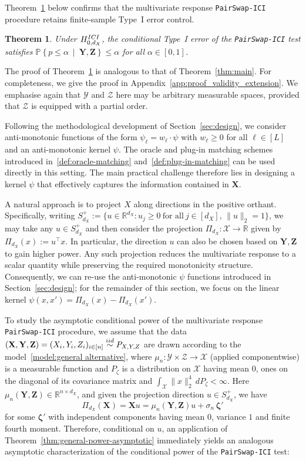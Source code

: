 \documentclass[12pt]{article}
\newtheorem{theorem}{Theorem}%
\newcommand{\R}{\mathbb{R}}
\newcommand{\eps}{\varepsilon}
\newcommand{\PPst}[2]{\mathbb{P}\left\{{#1}\  \middle| \ {#2}\right\}}
\newcommand{\iidsim}{\stackrel{\textnormal{iid}}{\sim}}
\newcommand{\Xcal}{\mathcal{X}}
\newcommand{\bX}{\mathbf{X}}
\newcommand{\bY}{\mathbf{Y}}
\newcommand{\bZ}{\mathbf{Z}}
\newcommand{\bzeta}{\mathbf{\eps}}
\def\bzeta{{\boldsymbol{\zeta}}}
\begin{document}
Theorem~\ref{thm:main-general} below confirms that the multivariate response \texttt{PairSwap-ICI} procedure retains finite-sample Type~I error control.

\begin{theorem}
    \label{thm:main-general}
    Under $H_{0,d_X}^{\textnormal{ICI}}$, the conditional Type~I error of the \textnormal{\texttt{PairSwap-ICI}} test satisfies $\PPst{p\le \alpha }{ \bY, \bZ}\le \alpha$ for all $\alpha \in [0,1]$.  
\end{theorem}


The proof of Theorem~\ref{thm:main-general} is analogous to that of Theorem~\ref{thm:main}. For completeness, we give the proof in Appendix~\ref{app:proof_validity_extension}.  We emphasise again that $\mathcal{Y}$ and $\mathcal{Z}$ here may be arbitrary measurable spaces, provided that  $\mathcal{Z}$ is equipped with a partial order.

Following the methodological development of Section~\ref{sec:design}, we consider anti-monotonic functions of the form $\psi_\ell=w_\ell\cdot\psi$ with $w_\ell\ge 0$ for all $\ell\in [L]$ and an anti-monotonic kernel $\psi$.  The oracle and plug-in matching schemes introduced in~\eqref{def:oracle-matching} and~\eqref{def:plug-in-matching} can be used directly in this setting. The main practical challenge therefore lies in designing a kernel $\psi$ that effectively captures the information contained in $\bX$.

A natural approach is to project $X$ along directions in the positive orthant. Specifically, writing $S^{+}_{d_X}:=\{u\in \R^{d_X}: u_j\ge 0~\text{for all}~j\in [d_X],\, \|u\|_2=1\}$, we may take any $u\in S^+_{d_X}$ and then consider the projection $\Pi_{d_X}:\mathcal{X} \rightarrow \mathbb{R}$ given by $\Pi_{d_X}(x) := u^\top x$. In particular, the direction $u$ can also be chosen based on $\bY,\bZ$ to gain higher power. Any such projection reduces the multivariate response to a scalar quantity while preserving the required monotonicity structure. Consequently, we can re-use the anti-monotonic $\psi$ functions introduced in Section~\ref{sec:design}; 
for the remainder of this section, we focus on the linear kernel $\psi(x,x')=\Pi_{d_X}(x)-\Pi_{d_X}(x')$.


To study the asymptotic conditional power of the multivariate response \texttt{PairSwap-ICI} procedure, we assume that the data $(\bX,\bY,\bZ) = (X_i,Y_i,Z_i)_{i\in [n]} \iidsim P_{X,Y,Z}$ are drawn according to the model~\eqref{model:general alternative}, where $\mu_n:\mathcal{Y} \times \mathcal{Z} \rightarrow \Xcal$ (applied componentwise) is a measurable function and $P_\zeta$ is a distribution on $\mathcal{X}$ having mean $0$, ones on the diagonal of its covariance matrix and $\int_{\mathcal{X}} \|x\|_2^4 \, dP_\zeta < \infty$.  Here $\mu_n(\bY,\bZ)\in\R^{n\times d_X}$, and given the projection direction $u \in S_{d_X}^+$, we have
\[
\Pi_{d_X}(\bX)=\bX u
=\mu_n(\bY,\bZ)u
+\sigma_n \,\bzeta'
\]
for some $\bzeta'$ with independent components having mean $0$, variance $1$ and finite fourth moment. Therefore, conditional on $u$, an application of Theorem~\ref{thm:general-power-asymptotic} immediately yields an analogous asymptotic characterization of the conditional power of the \texttt{PairSwap-ICI} test:
\end{document}
